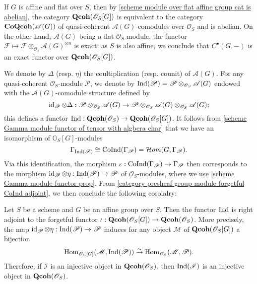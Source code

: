 If $G$ is affine and flat over $S$, then by \cref{scheme module over flat affine group cat is abelian}, the category $\mathbf{Qcoh}(\mathscr{O}_S[G])$ is equivalent to the category $\mathbf{CoQcoh}(\mathscr{A}(G))$ of quasi-coherent $\mathscr{A}(G)$-comodules over $\mathscr{O}_S$ and is abelian. On the other hand, $\mathscr{A}(G)$ being a flat $\mathscr{O}_S$-module, the functor $\mathscr{F}\mapsto\mathscr{F}\otimes_{\mathscr{O}_S}\mathscr{A}(G)^{\otimes n}$ is exact; as $S$ is also affine, we conclude that $C^\bullet(G,-)$ is an exact functor over $\mathbf{Qcoh}(\mathscr{O}_S[G])$.\par
We denote by $\Delta$ (resp. $\eta$) the coultiplication (resp. counit) of $\mathscr{A}(G)$. For any quasi-coherent $\mathscr{O}_S$-module $\mathscr{P}$, we denote by $\mathrm{Ind}(\mathscr{P})=\mathscr{P}\otimes_{\mathscr{O}_S}\mathscr{A}(G)$ endowed with the $\mathscr{A}(G)$-comodule structure defined by
\[\operatorname{id}_\mathscr{P}\otimes\Delta:\mathscr{P}\otimes_{\mathscr{O}_S}\mathscr{A}(G)\to\mathscr{P}\otimes_{\mathscr{O}_S}\mathscr{A}(G)\otimes_{\mathscr{O}_S}\mathscr{A}(G);\]
this defines a functor $\mathrm{Ind}:\mathbf{Qcoh}(\mathscr{O}_S)\to\mathbf{Qcoh}(\mathscr{O}_S[G])$. It follows from \cref{scheme Gamma module functor of tensor with algbera char} that we have an isomorphism of $\mathbb{O}_S[G]$-modules
\begin{equation}\label{scheme module over group Ind and CoInd relation}
\Gamma_{\mathrm{Ind}(\mathscr{P})}\cong \mathrm{CoInd}(\Gamma_\mathscr{P})=\operatorname{\mathcal{H}\hspace*{-0.4pt}\textit{om}\hspace{0.5pt}}(G,\Gamma_\mathscr{P}).
\end{equation}
Via this identification, the morphism $\varepsilon:\mathrm{CoInd}(\Gamma_\mathscr{P})\to\Gamma_\mathscr{P}$ then corresponds to the morphism $\operatorname{id}_\mathscr{P}\otimes \eta:\mathrm{Ind}(\mathscr{P})\to\mathscr{P}$ of $\mathscr{O}_S$-modules, where we use \cref{scheme Gamma module functor prop}. From \cref{category presheaf group module forgetful CoInd adjoint}, we then conclude the following corolalry:
\begin{corollary}\label{scheme module over group forgetful Ind adjoint}
Let $S$ be a scheme and $G$ be an affine group over $S$. Then the functor $\mathrm{Ind}$ is right adjoint to the forgetful functor $\iota:\mathbf{Qcoh}(\mathscr{O}_S[G])\to\mathbf{Qcoh}(\mathscr{O}_S)$. More precisely, the map $\operatorname{id}_\mathscr{P}\otimes\eta:\mathrm{Ind}(\mathscr{P})\to\mathscr{P}$ induces for any object $\mathscr{M}$ of $\mathbf{Qcoh}(\mathscr{O}_S[G])$ a bijection
\[\mathrm{Hom}_{\mathscr{O}_S[G]}(\mathscr{M},\mathrm{Ind}(\mathscr{P}))\stackrel{\sim}{\to}\mathrm{Hom}_{\mathscr{O}_S}(\mathscr{M},\mathscr{P}).\]
Therefore, if $\mathscr{I}$ is an injective object in $\mathbf{Qcoh}(\mathscr{O}_S)$, then $\mathrm{Ind}(\mathscr{I})$ is an injective object in $\mathbf{Qcoh}(\mathscr{O}_S)$.
\end{corollary}

